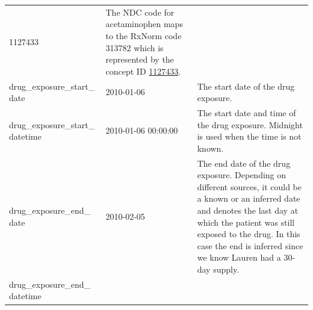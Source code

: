 \documentclass[11pt]{book}
\theoremstyle{definition}
\theoremstyle{definition}
\theoremstyle{definition}
\theoremstyle{remark}
\begin{document}
\begin{longtable}[]{@{}lll@{}}
\begin{minipage}[t]{0.15\columnwidth}
1127433\strut
\end{minipage} & \begin{minipage}[t]{0.49\columnwidth}\raggedright
The NDC code for acetaminophen maps to the RxNorm code 313782 which is represented by the concept ID \href{http://athena.ohdsi.org/search-terms/terms/1127433}{1127433}.\strut
\end{minipage}\tabularnewline
\begin{minipage}[t]{0.28\columnwidth}\raggedright
drug\_exposure\_start\_ date\strut
\end{minipage} & \begin{minipage}[t]{0.15\columnwidth}\raggedright
2010-01-06\strut
\end{minipage} & \begin{minipage}[t]{0.49\columnwidth}\raggedright
The start date of the drug exposure.\strut
\end{minipage}\tabularnewline
\begin{minipage}[t]{0.28\columnwidth}\raggedright
drug\_exposure\_start\_ datetime\strut
\end{minipage} & \begin{minipage}[t]{0.15\columnwidth}\raggedright
2010-01-06 00:00:00\strut
\end{minipage} & \begin{minipage}[t]{0.49\columnwidth}\raggedright
The start date and time of the drug exposure. Midnight is used when the time is not known.\strut
\end{minipage}\tabularnewline
\begin{minipage}[t]{0.28\columnwidth}\raggedright
drug\_exposure\_end\_ date\strut
\end{minipage} & \begin{minipage}[t]{0.15\columnwidth}\raggedright
2010-02-05\strut
\end{minipage} & \begin{minipage}[t]{0.49\columnwidth}\raggedright
The end date of the drug exposure. Depending on different sources, it could be a known or an inferred date and denotes the last day at which the patient was still exposed to the drug. In this case the end is inferred since we know Lauren had a 30-day supply.\strut
\end{minipage}\tabularnewline
\begin{minipage}[t]{0.28\columnwidth}\raggedright
drug\_exposure\_end\_ datetime\strut
\end{minipage} & \begin{minipage}[t]{0.15\columnwidth}\raggedright

\end{minipage}
\end{longtable}
\end{document}
